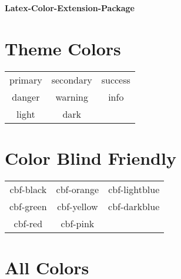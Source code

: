 \documentclass{article}
\begin{document}
\pagestyle{empty}
\begin{center}
    \LARGE
    \textbf{Latex-Color-Extension-Package}
\end{center}\vspace{10mm}

\section{Theme Colors}

\Large
\begin{tabular}{ |c|c|c| } 
    \hline 
    \cellcolor{primary}\color{white} primary & \cellcolor{secondary}\color{white} secondary & \cellcolor{success}\color{white} success \\
    \cellcolor{danger}\color{white} danger & \cellcolor{warning} warning & \cellcolor{info} info \\
    \cellcolor{light} light & \cellcolor{dark}\color{white} dark & \\
    \hline
\end{tabular}

\section{Color Blind Friendly}

\Large
\begin{tabular}{ |c|c|c| } 
    \hline 
    \cellcolor{cbf-black}\color{white} cbf-black & \cellcolor{cbf-orange}\color{white} cbf-orange & \cellcolor{cbf-lightblue}\color{white} cbf-lightblue \\
    \cellcolor{cbf-green}\color{white} cbf-green & \cellcolor{cbf-yellow} cbf-yellow & \cellcolor{cbf-darkblue} cbf-darkblue \\
    \cellcolor{cbf-red} cbf-red & \cellcolor{cbf-pink}\color{white} cbf-pink & \\
    \hline
\end{tabular}

\section{All Colors}
\end{document}
